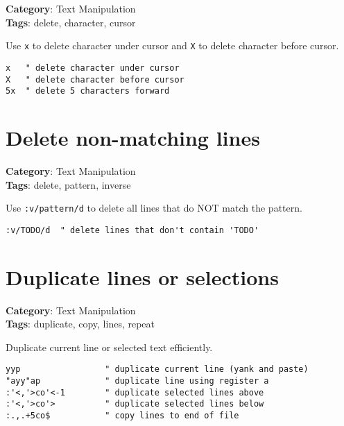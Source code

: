 {{{{{{{{{{{{{\textbf{Category}: Text Manipulation\\ \textbf{Tags}: delete, character, cursor
\vspace{0.5cm}

Use {\footnotesize \Verb§x§} to delete character under cursor and {\footnotesize \Verb§X§} to delete character before cursor.

\begin{Exa*}{}
\begin{Verbatim}[fontsize=\footnotesize, breaklines, breakanywhere]
x   " delete character under cursor
X   " delete character before cursor
5x  " delete 5 characters forward
\end{Verbatim}
\end{Exa*}

\section{Delete non-matching lines}

\textbf{Category}: Text Manipulation\\ \textbf{Tags}: delete, pattern, inverse
\vspace{0.5cm}

Use {\footnotesize \Verb§:v/pattern/d§} to delete all lines that do NOT match the pattern.

\begin{Exa*}{}
\begin{Verbatim}[fontsize=\footnotesize, breaklines, breakanywhere]
:v/TODO/d  " delete lines that don't contain 'TODO'
\end{Verbatim}
\end{Exa*}

\section{Duplicate lines or selections}

\textbf{Category}: Text Manipulation\\ \textbf{Tags}: duplicate, copy, lines, repeat
\vspace{0.5cm}

Duplicate current line or selected text efficiently.

\begin{Exa*}{}
\begin{Verbatim}[fontsize=\footnotesize, breaklines, breakanywhere]
yyp                 " duplicate current line (yank and paste)
"ayy"ap             " duplicate line using register a
:'<,'>co'<-1        " duplicate selected lines above
:'<,'>co'>          " duplicate selected lines below
:.,.+5co$           " copy lines to end of file
\end{Verbatim}
\end{Exa*}

}}}}}}}}}}}}}

